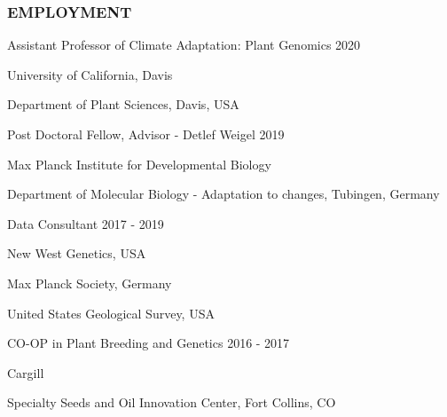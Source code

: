 \documentclass[12pt,english]{article}
\begin{document}

\subsubsection*{EMPLOYMENT}
\vspace{-0.5ex}\par

\hspace{1.0em} Assistant Professor of Climate Adaptation: Plant Genomics
\hfill
2020
\vspace{-0.5ex}\par
\hspace{2.0em} University of California, Davis
\vspace{-0.5ex}\par
\hspace{2.0em} Department of Plant Sciences, Davis, USA
\hfill
\vspace{0.5em}\par

\hspace{1.0em} Post Doctoral Fellow, Advisor - Detlef Weigel
\hfill
2019
\vspace{-0.5ex}\par
\hspace{2.0em} Max Planck Institute for Developmental Biology
\vspace{-0.5ex}\par
\hspace{2.0em} Department of Molecular Biology - Adaptation to changes, Tubingen, Germany
\hfill
\vspace{0.5em}\par

\hspace{1.0em} Data Consultant 
\hfill
2017 - 2019
\vspace{-0.5ex}\par
\hspace{2.0em} New West Genetics, USA
\vspace{-0.5ex}\par
\hspace{2.0em} Max Planck Society, Germany
\vspace{-0.5ex}\par
\hspace{2.0em} United States Geological Survey, USA
\hfill
\vspace{0.5em}\par

\hspace{1.0em} CO-OP in Plant Breeding and Genetics
\hfill
2016 - 2017
\vspace{-0.5ex}\par
\hspace{2.0em} Cargill
\vspace{-0.5ex}\par
\hspace{2.0em} Specialty Seeds and Oil Innovation Center, Fort Collins, CO
\vspace{0.5em}\par
\end{document}
